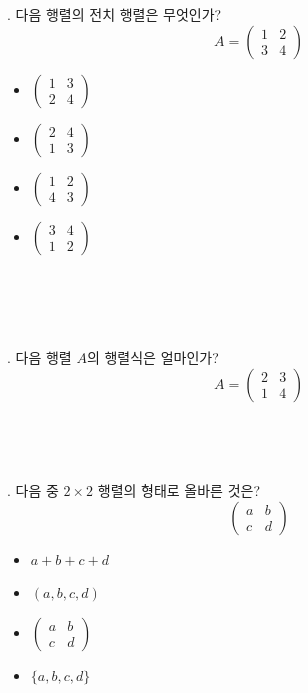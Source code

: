 \documentclass[fleqn]{article}
\begin{document}
. 다음 행렬의 전치 행렬은 무엇인가?  
\[
A = \begin{pmatrix} 1 & 2 \\ 3 & 4 \end{pmatrix}
\]  
\begin{itemize}
    \item [(A)] \(\begin{pmatrix} 1 & 3 \\ 2 & 4 \end{pmatrix}\)
    \item [(B)] \(\begin{pmatrix} 2 & 4 \\ 1 & 3 \end{pmatrix}\)
    \item [(C)] \(\begin{pmatrix} 1 & 2 \\ 4 & 3 \end{pmatrix}\)
    \item [(D)] \(\begin{pmatrix} 3 & 4 \\ 1 & 2 \end{pmatrix}\)
\end{itemize}\\\\\\\\

. 다음 행렬 \(A\)의 행렬식은 얼마인가?  
\[
A = \begin{pmatrix} 2 & 3 \\ 1 & 4 \end{pmatrix}
\]\\\\\\\\

. 다음 중 \(2 \times 2\) 행렬의 형태로 올바른 것은?  
\[
\begin{pmatrix} a & b \\ c & d \end{pmatrix}
\]  
\begin{itemize}
    \item [(A)] \(a + b + c + d\)
    \item [(B)] \((a, b, c, d)\)
    \item [(C)] \(\begin{pmatrix} a & b \\ c & d \end{pmatrix}\)
    \item [(D)] \(\{a, b, c, d\}\)
\end{itemize}\\\\\\\\
\end{document}
